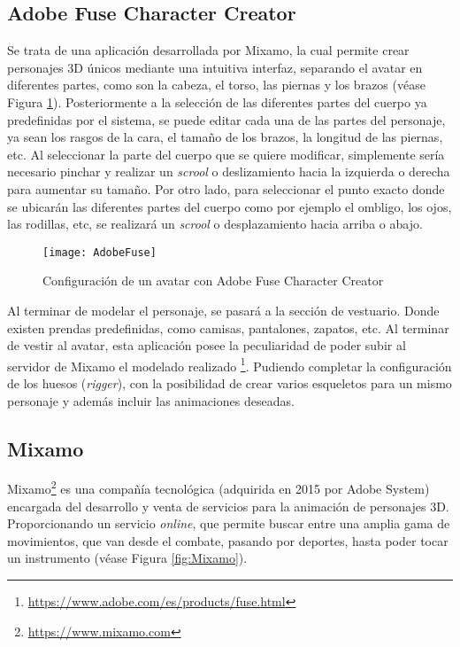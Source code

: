 \subsection{Adobe Fuse Character Creator}

Se trata de una aplicación desarrollada por Mixamo, la cual permite crear personajes 3D únicos mediante una intuitiva interfaz, separando el avatar en diferentes partes, como son la cabeza, el torso, las piernas y los brazos (véase Figura \ref{fig:AdobeFuse}). Posteriormente a la selección de las diferentes partes del cuerpo ya predefinidas por el sistema, se puede editar cada una de las partes del personaje, ya sean los rasgos de la cara, el tamaño de los brazos, la longitud de las piernas, etc. Al seleccionar la parte del cuerpo que se quiere modificar, simplemente sería necesario pinchar y realizar un \textit{scrool} o deslizamiento hacia la izquierda o derecha para aumentar su tamaño. Por otro lado, para seleccionar el punto exacto donde se ubicarán las diferentes partes del cuerpo como por ejemplo el ombligo, los ojos, las rodillas, etc, se realizará un \textit{scrool} o desplazamiento hacia arriba o abajo.

\begin{figure}[h!]
	\centering
	\texttt{[image: AdobeFuse]}
	\caption{Configuración de un avatar con Adobe Fuse Character Creator}
	\label{fig:AdobeFuse}
\end{figure}

Al terminar de modelar el personaje, se pasará a la sección de vestuario. Donde existen prendas predefinidas, como camisas, pantalones, zapatos, etc. Al terminar de vestir al avatar, esta aplicación posee la peculiaridad de poder subir al servidor de Mixamo el modelado realizado \footnote{\url{https://www.adobe.com/es/products/fuse.html}}. Pudiendo completar la configuración de los huesos (\textit{rigger}), con la posibilidad de crear varios esqueletos para un mismo personaje y además incluir las animaciones deseadas.



\subsection{Mixamo}
\label{cap4:sec:mixamo}

Mixamo\footnote{\url{https://www.mixamo.com}} es una compañía tecnológica (adquirida en 2015 por Adobe System) encargada del desarrollo y venta de servicios para la animación de personajes 3D. Proporcionando un servicio \textit{online}, que permite buscar entre una amplia gama de movimientos, que van desde el combate, pasando por deportes, hasta poder tocar un instrumento (véase Figura \ref{fig:Mixamo}).

